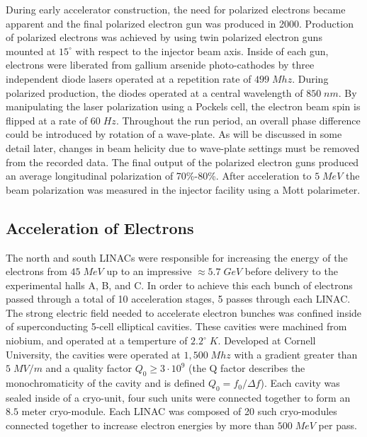 During early accelerator construction, the need for polarized electrons became apparent and the final polarized electron gun was produced in 2000.  Production of polarized electrons was achieved by using twin polarized electron guns mounted at $15^\circ$ with respect to the injector beam axis.  Inside of each gun, electrons were liberated from gallium arsenide photo-cathodes by three independent diode lasers operated at a repetition rate of $499 \; Mhz$.  During polarized production, the diodes operated at a central wavelength of $850 \; nm$.  By manipulating the laser polarization using a Pockels cell, the electron  beam spin is flipped at a rate of $60 \; Hz$.  Throughout the run period, an overall phase difference could be introduced by rotation of a wave-plate.  As will be discussed in some detail later, changes in beam helicity due to wave-plate settings must be removed from the recorded data.  The final output of the polarized electron guns produced an average longitudinal polarization of 70\%-80\%.  After acceleration to $5 \; MeV$ the beam polarization was measured in the injector facility using a Mott polarimeter. \\


\subsection{Acceleration of Electrons}    
The north and south LINACs were responsible for increasing the energy of the electrons from $45 \; MeV$ up to an impressive $\approx 5.7 \; GeV$ before delivery to the experimental halls A, B, and C.  In order to achieve this each bunch of electrons passed through a total of 10 acceleration stages, 5 passes through each LINAC.  The strong electric field needed to accelerate electron bunches was confined inside of superconducting 5-cell elliptical cavities.  These cavities were machined from niobium, and operated at a temperture of $2.2^\circ \; K$.  Developed at Cornell University, the cavities were operated at $1,500 \; Mhz$ with a gradient greater than $5 \; MV/m$ and a quality factor $Q_0 \geq 3 \cdot 10^9$ (the Q factor describes the monochromaticity of the cavity and is defined $Q_0 = f_0/\Delta f$).  Each cavity was sealed inside of a cryo-unit, four such units were connected together to form an $8.5$ meter cryo-module.  Each LINAC was composed of 20 such cryo-modules connected together to increase electron energies by more than $500 \; MeV$ per pass.\\

